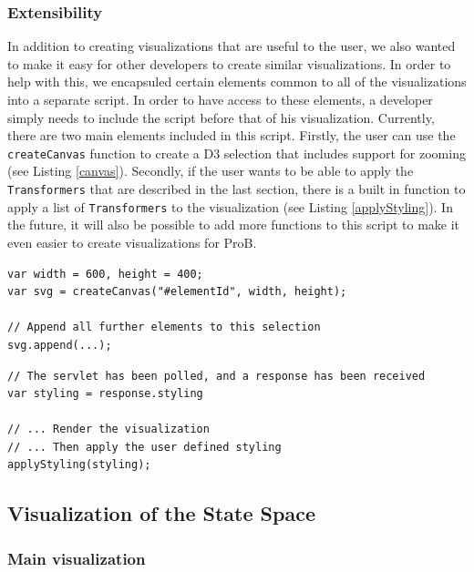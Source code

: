 \subsubsection{Extensibility}

In addition to creating visualizations that are useful to the user, we also wanted to make it easy for other developers to create similar visualizations. In order to help with this, we encapsuled certain elements common to all of the visualizations into a separate script. In order to have access to these elements, a developer simply needs to include the script before that of his visualization. Currently, there are two main elements included in this script. Firstly, the user can use the \texttt{createCanvas} function to create a D3 selection that includes support for zooming (see Listing \ref{canvas}). Secondly, if the user wants to be able to apply the \texttt{Transformers} that are described in the last section, there is a built in function to apply a list of \texttt{Transformers} to the visualization (see Listing \ref{applyStyling}). In the future, it will also be possible to add more functions to this script to make it even easier to create visualizations for ProB.

\begin{lstlisting}[caption=Append a D3 selection to an element that includes support for zooming,label=canvas]
var width = 600, height = 400;
var svg = createCanvas("#elementId", width, height);

// Append all further elements to this selection
svg.append(...);
\end{lstlisting}

\begin{lstlisting}[caption=Apply list of \texttt{Transformers} received from servlet,label=applyStyling]
// The servlet has been polled, and a response has been received
var styling = response.styling

// ... Render the visualization
// ... Then apply the user defined styling
applyStyling(styling);
\end{lstlisting}


\subsection{Visualization of the State Space}

\subsubsection{Main visualization}

